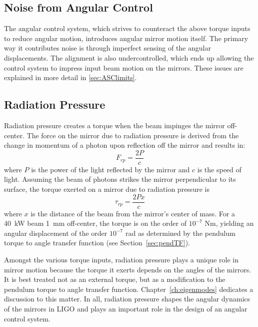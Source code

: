 

\subsection{Noise from Angular Control}
The angular control system, which strives to counteract the above torque inputs to reduce angular motion, introduces angular mirror motion itself. The primary way it contributes noise is through imperfect sensing of the angular displacements. The alignment is also undercontrolled, which ends up allowing the control system to impress input beam motion on the mirrors. These issues are explained in more detail in \ref{sec:ASClimits}.


\subsection{Radiation Pressure} 
\label{sec:rp_intro}
Radiation pressure creates a torque when the beam impinges the mirror
off-center. The force on the mirror due to radiation pressure is
derived from the change in momentum of a photon upon reflection off
the mirror and results in:
\begin{equation}
F_{rp} = \frac{2 P} {c}
\end{equation}
where $P$ is the power of the light reflected by the mirror and $c$ is the
speed of light. Assuming the beam of photons strikes the mirror
perpendicular to its surface, the torque exerted on a mirror due to
radiation pressure is
\begin{equation}
\tau_{rp} = \frac{2 P x} {c}
\label{eq:tau_rp}
\end{equation}
where $x$ is the distance of the beam from the mirror's center of mass. For a 40~kW beam 1~mm off-center, the torque is on the order of $10^{-7}$ Nm, yielding an angular displacement of the order $10^{-7}$ rad as determined by the pendulum torque to angle transfer function (see Section~\ref{sec:pendTF}).

Amongst the various torque inputs, radiation pressure plays a unique role in mirror motion because the torque it exerts depends on the angles of the mirrors. 
It is best treated not as an external torque, but as a modification to the pendulum torque to angle transfer function. Chapter~\ref{ch:eigenmodes} dedicates a discussion to this matter. In all, radiation pressure shapes the angular dynamics of the mirrors in LIGO and plays an important role in the design of an angular control system.






